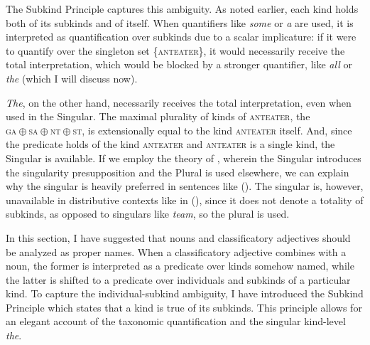 \documentclass[a4paper, 12pt]{article}
\begin{document}
The Subkind Principle captures this ambiguity. As noted earlier, each kind holds both of its subkinds and of itself. When quantifiers like \textit{some} or \textit{a} are used, it is interpreted as quantification over subkinds due to a scalar implicature: if it were to quantify over the singleton set \{\textsc{anteater}\}, it would necessarily receive the total interpretation, which would be blocked by a stronger quantifier, like \textit{all} \parencite{horn1976semanticpropertieslogical} or \textit{the} (which I will discuss now).

\textit{The}, on the other hand, necessarily receives the total interpretation, even when used in the Singular. The maximal plurality of kinds of \textsc{anteater}, the \textsc{$\text{ga}\oplus\text{sa}\oplus\text{nt}\oplus\text{st}$}, is extensionally equal to the kind \textsc{anteater} itself. And, since the predicate holds of the kind \textsc{anteater} and \textsc{anteater} is a single kind, the Singular is available. If we employ the theory of \textcite{sauerland2005pluralsemanticallyunmarked}, wherein the Singular introduces the singularity presupposition and the Plural is used elsewhere, we can explain why the singular is heavily preferred in sentences like (). The singular is, however, unavailable in distributive contexts like in (), since it does not denote a totality of subkinds, as opposed to singulars like \textit{team}, so the plural is used.

In this section, I have suggested that nouns and classificatory adjectives should be analyzed as proper names. When a classificatory adjective combines with a noun, the former is interpreted as a predicate over kinds somehow named, while the latter is shifted to a predicate over individuals and subkinds of a particular kind. To capture the individual-subkind ambiguity, I have introduced the Subkind Principle which states that a kind is true of its subkinds. This principle allows for an elegant account of the taxonomic quantification and the singular kind-level \textit{the}.



\end{document}
